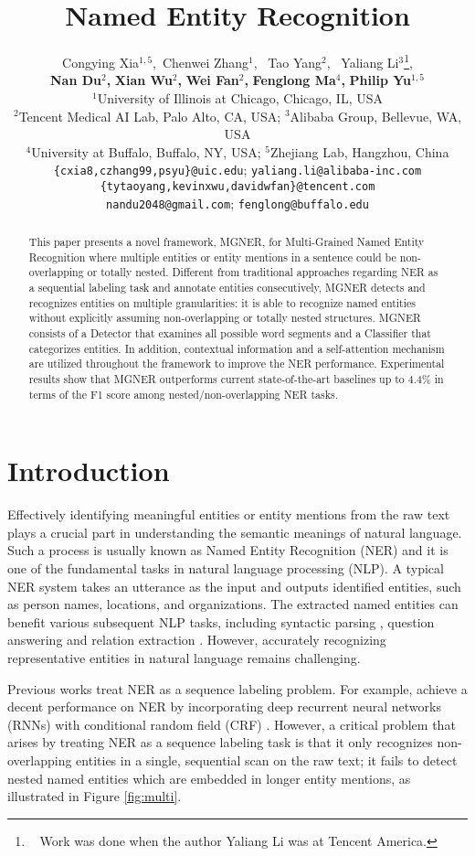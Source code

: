 \documentclass[11pt,a4paper]{article}
\title{{\multi} Named Entity Recognition}
\author{Congying Xia{$^{1,5}$},~Chenwei Zhang{$^1$}, ~Tao Yang$^2$, ~Yaliang Li$^{3}$\thanks{~ Work was done when the author Yaliang Li was at Tencent America.},\\
\textbf{Nan Du}$^{2}$\textbf{,} \textbf{Xian Wu}$^{2}$\textbf{,} \textbf{Wei Fan}$^{2}$\textbf{,} \textbf{Fenglong Ma}$^{4}$\textbf{,} \textbf{Philip Yu}{$^{1,5}$}\\
  {$^1$University of Illinois at Chicago, Chicago, IL, USA} \\
  {$^2$Tencent Medical AI Lab, Palo Alto, CA, USA};
    {$^3$Alibaba Group, Bellevue, WA, USA}\\
    {$^4$University at Buffalo, Buffalo, NY, USA};
   {$^5$Zhejiang Lab, Hangzhou, China}\\
  {\tt \{cxia8,czhang99,psyu\}@uic.edu};  
   {\tt yaliang.li@alibaba-inc.com} \\
  {\tt \{tytaoyang,kevinxwu,davidwfan\}@tencent.com}\\
 {\tt nandu2048@gmail.com};
  {\tt fenglong@buffalo.edu} \\
}
\date{}
\newcommand{\ModelName}{\textsc{MGNER}}
\newcommand{\multi}{Multi-Grained}
\begin{document}
\maketitle
\begin{abstract}
This paper presents a novel framework, {\ModelName}, for {\multi} Named Entity Recognition where multiple entities or entity mentions in a sentence could be non-overlapping or totally nested. 
Different from traditional approaches regarding NER as a sequential labeling task and annotate entities consecutively, {\ModelName} detects and recognizes entities on multiple granularities: it is able to recognize named entities without explicitly assuming non-overlapping or totally nested structures.
{\ModelName} consists of a Detector that examines all possible word segments and a Classifier that categorizes entities.
In addition, contextual information and a self-attention mechanism are utilized throughout the framework to improve the NER performance.
Experimental results show that {\ModelName} outperforms current state-of-the-art baselines up to 4.4\% in terms of the F1 score among nested/non-overlapping NER tasks.
\end{abstract}


\section{Introduction}
Effectively identifying meaningful entities or entity mentions from the raw text plays a crucial part in understanding the semantic meanings of natural language. Such a process is usually known as Named Entity Recognition (NER) and it is one of the fundamental tasks in natural language processing (NLP). A typical NER system takes an utterance as the input and outputs identified entities, such as person names, locations, and organizations. The extracted named entities can benefit various subsequent NLP tasks, including syntactic parsing \cite{koo2010efficient}, question answering \cite{krishnamurthy2015learning} and relation extraction \cite{lao2010relational}. However, accurately recognizing representative entities in natural language remains challenging.

Previous works treat NER as a sequence labeling problem. For example, \citet{lample2016neural} achieve a decent performance on NER by incorporating deep recurrent neural networks (RNNs) with conditional random field (CRF) \cite{lafferty2001conditional}.
However, a critical problem that arises by treating NER as a sequence labeling task is that it only recognizes non-overlapping entities in a single, sequential scan on the raw text; it fails to detect nested named entities which are embedded in longer entity mentions, as illustrated in Figure \ref{fig:multi}. 
\end{document}
